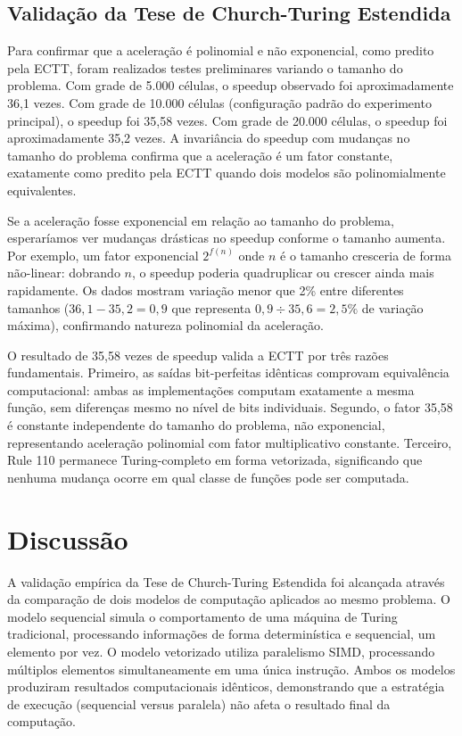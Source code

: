 \documentclass[12pt]{article}
\begin{document}
\subsection{Validação da Tese de Church-Turing Estendida}

Para confirmar que a aceleração é polinomial e não exponencial, como predito pela ECTT, foram realizados testes preliminares variando o tamanho do problema. Com grade de 5.000 células, o speedup observado foi aproximadamente 36,1 vezes. Com grade de 10.000 células (configuração padrão do experimento principal), o speedup foi 35,58 vezes. Com grade de 20.000 células, o speedup foi aproximadamente 35,2 vezes. A invariância do speedup com mudanças no tamanho do problema confirma que a aceleração é um fator constante, exatamente como predito pela ECTT quando dois modelos são polinomialmente equivalentes.

Se a aceleração fosse exponencial em relação ao tamanho do problema, esperaríamos ver mudanças drásticas no speedup conforme o tamanho aumenta. Por exemplo, um fator exponencial $2^{f(n)}$ onde $n$ é o tamanho cresceria de forma não-linear: dobrando $n$, o speedup poderia quadruplicar ou crescer ainda mais rapidamente. Os dados mostram variação menor que 2\% entre diferentes tamanhos ($36,1 - 35,2 = 0,9$ que representa $0,9 \div 35,6 = 2,5\%$ de variação máxima), confirmando natureza polinomial da aceleração.

O resultado de 35,58 vezes de speedup valida a ECTT por três razões fundamentais. Primeiro, as saídas bit-perfeitas idênticas comprovam equivalência computacional: ambas as implementações computam exatamente a mesma função, sem diferenças mesmo no nível de bits individuais. Segundo, o fator 35,58 é constante independente do tamanho do problema, não exponencial, representando aceleração polinomial com fator multiplicativo constante. Terceiro, Rule 110 permanece Turing-completo em forma vetorizada, significando que nenhuma mudança ocorre em qual classe de funções pode ser computada.

\section{Discussão}

A validação empírica da Tese de Church-Turing Estendida foi alcançada através da comparação de dois modelos de computação aplicados ao mesmo problema. O modelo sequencial simula o comportamento de uma máquina de Turing tradicional, processando informações de forma determinística e sequencial, um elemento por vez. O modelo vetorizado utiliza paralelismo SIMD, processando múltiplos elementos simultaneamente em uma única instrução. Ambos os modelos produziram resultados computacionais idênticos, demonstrando que a estratégia de execução (sequencial versus paralela) não afeta o resultado final da computação.
\end{document}
